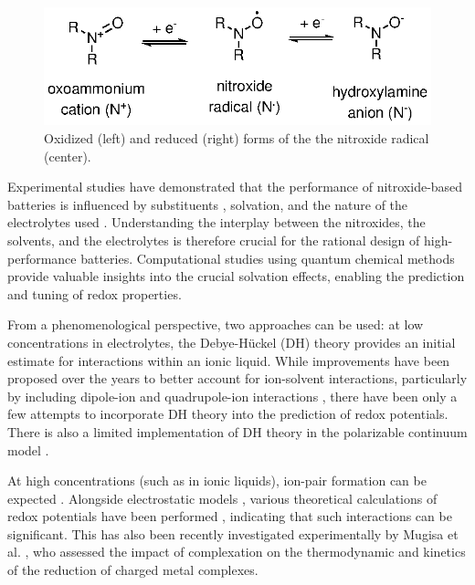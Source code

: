 \documentclass[review,preprint]{elsarticle}
\begin{document}
\begin{figure}[!h]
	\centering
	\includegraphics[width=.7\linewidth]{Figure1}
	\caption{Oxidized (left) and reduced (right) forms of the the nitroxide radical (center).}
	\label{fig:states}
\end{figure}

Experimental studies have demonstrated that the performance of nitroxide-based batteries is influenced by substituents \cite{sugaCathodeAnodeActivePoly2007}, solvation, and the nature of the electrolytes used \cite{armandIonicliquidMaterialsElectrochemical2009,strehmelRadicalsIonicLiquids2012,wylieIncreasedStabilityNitroxide2019b}. Understanding the interplay between the nitroxides, the solvents, and the electrolytes is therefore crucial for the rational design of high-performance batteries. Computational studies using quantum chemical methods provide valuable insights into the crucial solvation effects, enabling the prediction and tuning of redox properties.

From a phenomenological perspective, two approaches can be used: at low concentrations in electrolytes, the Debye-Hückel (DH) theory \cite{kontogeorgisDebyeHuckelTheoryIts2018,silvaDerivationsDebyeHuckel2022,silvaImprovingBornEquation2024} provides an initial estimate for interactions within an ionic liquid. While improvements have been proposed over the years to better account for ion-solvent interactions, particularly by including dipole-ion \cite{silvaImprovingBornEquation2024} and quadrupole-ion interactions \cite{slavchovQuadrupoleTermsMaxwell2014,slavchovQuadrupoleTermsMaxwell2014a,coxQuadrupolemediatedDielectricResponse2021}, there have been only a few attempts \cite{matsuiDensityFunctionalTheory2013,xiaoReorganizationEnergyElectron2013,xiaoMolecularDebyeHuckelApproach2014} to incorporate DH theory into the prediction of redox potentials. There is also a limited implementation of DH theory in the polarizable continuum model \cite{cossiInitioStudyIonic1998}. 

At high concentrations (such as in ionic liquids), ion-pair formation can be expected \cite{marcusIonPairing2006}. Alongside electrostatic models \cite{krishtalikElectrostaticIonSolvent1991,lundDielectricInterpretationSpecificity2010}, various theoretical calculations of redox potentials have been performed \cite{mehtaTheoreticalInvestigationRedox2007,quAccurateModelingEffect2016,taherkhaniInvestigationIonPairs2022}, indicating that such interactions can be significant. This has also been recently investigated experimentally by Mugisa et al. \cite{mugisaEffectIonparingKinetics2024}, who assessed the impact of complexation on the thermodynamic and kinetics of  the reduction  of charged metal complexes.
\end{document}
